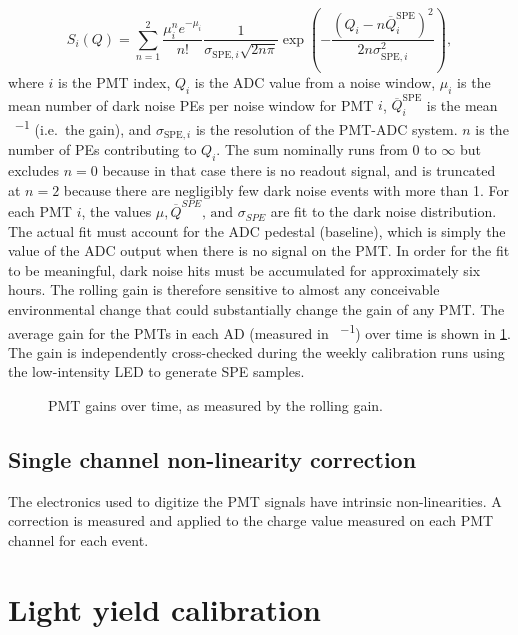 \begin{equation}
    S_i(Q) = \sum_{n=1}^2 \frac{\mu_i^n e^{-\mu_i}}{n!}
    \frac{1}{\sigma_{\text{SPE},i}\sqrt{2n\pi}}
    \exp
    \left(
        -\frac{(Q_i-n\overline{Q}_i^{\text{SPE}})^2}{2n\sigma^2_{\text{SPE},i}}
    \right),
\end{equation}
where $i$ is the PMT index,
$Q_i$ is the ADC value from a noise window,
$\mu_i$ is the mean number of dark noise PEs per noise window for PMT $i$,
$\overline{Q}_i^{\text{SPE}}$ is the mean \si{\adc\per\pe} (i.e.\ the gain),
and $\sigma_{\text{SPE},i}$ is the resolution of the PMT-ADC system.
$n$ is the number of PEs contributing to $Q_i$.
The sum nominally runs from $0$ to $\infty$ but
excludes $n=0$ because in that case there is no readout signal,
and is truncated at $n=2$ because there are negligibly few dark noise events
with more than \SI{1}{\pe}.
For each PMT $i$, the values $\mu,\overline{Q}^{SPE}\text{, and }\sigma_{SPE}$ are fit
to the dark noise distribution.
The actual fit must account for the ADC pedestal (baseline),
which is simply the value of the ADC output when there is no signal on the PMT.
In order for the fit to be meaningful, dark noise hits must be accumulated
for approximately six hours.
The rolling gain is therefore sensitive to almost any conceivable
environmental change that could substantially change the gain of any PMT.
The average gain for the PMTs in each AD (measured in \si{\adc\per\pe})
over time is shown in \cref{fig:gain}.
The gain is independently cross-checked during the weekly calibration runs
using the low-intensity LED to generate SPE samples.

\begin{figure}
    \caption{PMT gains over time, as measured by the rolling gain.}
    \label{fig:gain}
\end{figure}

\subsection{Single channel non-linearity correction}
\label{subsec:scnl}

The electronics used to digitize the PMT signals have intrinsic
non-linearities.
A correction is measured and applied to the charge value measured on each PMT channel
for each event.


\section{Light yield calibration}
\label{sec:light_yield_calib}

